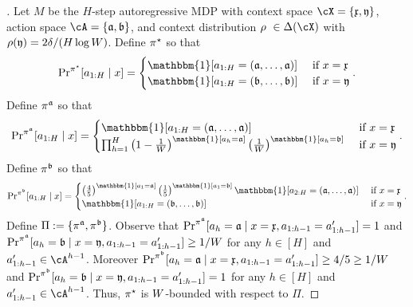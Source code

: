   
  \begin{proof}[]
  Let $M$ be the $H$-step autoregressive MDP with context space $\cX = \{\xfrak,\yfrak\}$, action space $\cA = \{\afrak,\bfrak\}$, and context distribution $\rho \ \in\Delta(\cX)$ with $\rho(\mathfrak{y}) = 2\delta/(H\log W)$. Define $\pi^{\star}$ so that 
  \[ 
  \Pr^{\pistar}[a_{1:H} \mid{} x] = \begin{cases} 
  \mathbbm{1}[a_{1:H}=(\afrak,\dots,\afrak)] &\text{ if } x =\xfrak \\ 
  \mathbbm{1}[a_{1:H} = (\bfrak,\dots,\bfrak)] & \text{ if } x = \yfrak 
  \end{cases}.
  \]
  Define $\pi^{\mathfrak{a}}$ so that
\[ 
  \Pr^{\pia}[a_{1:H} \mid{} x] = \begin{cases} 
  \mathbbm{1}[a_{1:H}=(\afrak,\dots,\afrak)] &\text{ if } x=\xfrak \\ 
  \prod_{h=1}^H \left(1-\frac{1}{\denbound}\right)^{\mathbbm{1}[a_h=\afrak]}\left(\frac{1}{\denbound}\right)^{\mathbbm{1}[a_h=\bfrak]} & \text{ if } x = \yfrak 
  \end{cases}.
  \]
  Define $\pi^{\mathfrak{b}}$ so that
  \[ 
  \Pr^{\pib}[a_{1:H} \mid{} x] = \begin{cases}
  \left(\frac{4}{5}\right)^{\mathbbm{1}[a_1=\afrak]} \left(\frac{1}{5}\right)^{\mathbbm{1}[a_1=\bfrak]}\mathbbm{1}[a_{2:H}=(\afrak,\dots,\afrak)] &\text{ if } x=\xfrak \\ 
  \mathbbm{1}[a_{1:H} = (\bfrak,\dots,\bfrak)] & \text{ if } x = \yfrak 
  \end{cases}.
  \]
  Define $\Pi := \{\pi^{\mathfrak{a}},\pi^{\mathfrak{b}}\}$. Observe that $\operatorname{Pr}^{\pi^{\mathfrak{a}}}[a_h=\mathfrak{a} \mid{} x=\mathfrak{x}, a_{1:h-1}=a'_{1:h-1}] = 1$ and $\operatorname{Pr}^{\pi^{\mathfrak{a}}}[a_h=\mathfrak{b} \mid{} x=\mathfrak{y}, a_{1:h-1}=a'_{1:h-1}] \geq 1/W$ for any $h \in [H]$ and $a'_{1:h-1} \in \cA^{h-1}$. Moreover $\operatorname{Pr}^{\pi^{\mathfrak{b}}}[a_h=\mathfrak{a} \mid{} x=\mathfrak{x}, a_{1:h-1}=a'_{1:h-1}] \geq 4/5 \geq 1/W$ and $\operatorname{Pr}^{\pi^{\mathfrak{b}}}[a_h=\mathfrak{b} \mid{} x=\mathfrak{y}, a_{1:h-1}=a'_{1:h-1}] = 1$ for any $h \in [H]$ and $a'_{1:h-1} \in \cA^{h-1}$. Thus, $\pi^{\star}$ is $W$-bounded with respect to $\Pi$.
  

\end{proof}
